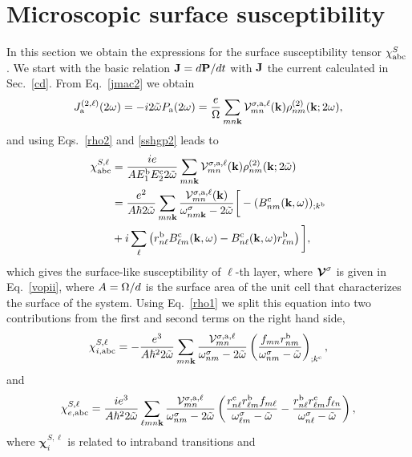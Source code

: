\documentclass[floatfix,prb,aps,superscriptaddress,11pt,preprint,letterpaper]{revtex4}
\begin{document}
\section{Microscopic surface susceptibility}
In this section we obtain the expressions for the 
surface susceptibility tensor $\chi^S_{\mathrm{a}\mathrm{b}\mathrm{c}}$.
We start with the basic relation $\mathbf{J}=d\mathbf{P}/dt$ 
with $\mathbf{J}$ the current calculated in Sec.~\ref{cd}. From Eq.~\eqref{jmac2} 
we obtain
\begin{equation}\label{Pjikn}
J_{\mathrm{a}}^{(2,\ell)}(2\omega)=-i2\tilde\omega P_{\mathrm{a}}(2\omega)
=\frac{e}{\Omega}
\sum_{mn\mathbf{k}}
{\mathbf{\cal V}}^{\sigma,\mathrm{a},\ell}_{mn}(\mathbf{k})
\rho^{(2)}_{nm}(\mathbf{k};2\omega)
,
\end{equation}
and using Eqs.~\eqref{rho2} and \eqref{sshgp2} leads to
\begin{align}\label{Pjikn2}
\chi^{S,\ell}_{\mathrm{a}\mathrm{b}\mathrm{c}}
&=
\frac{ie}{A E^{\mathrm{b}}_1E^{\mathrm{c}}_2 2\tilde\omega}
\sum_{mn\mathbf{k}}
{\mathbf{\cal V}}^{\sigma,\mathrm{a},\ell}_{mn}(\mathbf{k})
\rho^{(2)}_{nm}(\mathbf{k};2\tilde\omega)
\nonumber \\
&=
\frac{e^2}{A\hbar2\tilde\omega}
\sum_{mn\mathbf{k}}
\frac{{\mathbf{\cal V}}^{\sigma,\mathrm{a},\ell}_{mn}(\mathbf{k})}
{\omega^\sigma_{nm\mathbf{k}}-2\tilde\omega}
\bigg[
-(B_{nm}^{\mathrm{c}}(\mathbf{k},\omega))_{;k^{\mathrm{b}}}
\nonumber \\
&
+i\sum_\ell\left(r_{n\ell}^{\mathrm{b}}B_{\ell m}^{\mathrm{c}}(\mathbf{k},\omega) -
  B_{n\ell}^{\mathrm{c}}(\mathbf{k},\omega) 
  r_{\ell m}^{\mathrm{b}}\right)
\bigg]
,
\end{align}
which gives the surface-like susceptibility of $\ell$-th layer, where 
$\boldsymbol{\mathcal{\cal V}}^\sigma$ is given in Eq.~\eqref{vopii},
where $A=\Omega/d$ is the surface area of the unit
cell that characterizes the surface of the system.
Using Eq.~\eqref{rho1} we
split this equation into
two contributions from the first and second terms on the right hand side,
\begin{equation}\label{chii}
\chi_{i,\mathrm{a}\mathrm{b}\mathrm{c}}^{S,\ell}
=-\frac{e^3}{A\hbar^22\tilde\omega}\sum_{mn\mathbf{k}}
\frac{{\mathbf{\cal V}}_{mn}^{\sigma,\mathrm{a},\ell}}{\omega^\sigma_{nm}-2\tilde\omega}
\left(\frac{f_{mn}r_{nm}^{\mathrm{b}}}{\omega^\sigma_{nm}-\tilde\omega}\right)_{;k^{\mathrm{c}}},
\end{equation} 
and 
\begin{equation}\label{chie}
\chi_{e,\mathrm{a}\mathrm{b}\mathrm{c}}^{S,\ell}
=\frac{ie^3}{A\hbar^22\tilde\omega}\sum_{\ell mn\mathbf{k}}
\frac{{\mathbf{\cal V}}_{mn}^{\sigma,\mathrm{a},\ell}}{\omega^\sigma_{nm}-2\tilde\omega}
\left(
\frac{r_{n\ell}^{\mathrm{c}} r_{\ell m}^{\mathrm{b}} 
f_{m\ell}}{\omega^\sigma_{\ell m}-\tilde\omega}
-\frac{r_{n\ell}^{\mathrm{b}} r_{\ell m}^{\mathrm{c}} 
f_{\ell n}}{\omega^\sigma_{n \ell}-\tilde\omega}
\right),
\end{equation} 
where $\boldsymbol{\chi}^{S,\ell}_i$
 is related to intraband transitions and
\end{document}
